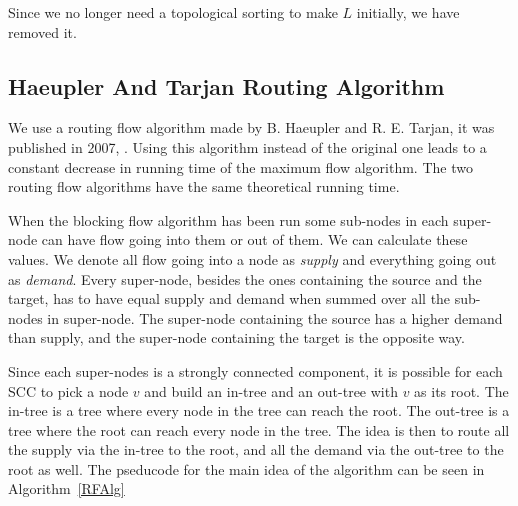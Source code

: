 Since we no longer need a topological sorting to make $L$ initially, we have removed it.

\subsection{Haeupler And Tarjan Routing Algorithm}\label{GR-RF}
We use a routing flow algorithm made by B. Haeupler and R. E. Tarjan, it was published in 2007, \cite{Haeupler2007}.
Using this algorithm instead of the original one leads to a constant decrease in running time of the maximum flow algorithm.
The two routing flow algorithms have the same theoretical running time.

When the blocking flow algorithm has been run some sub-nodes in each super-node can have flow going into them or out of them.
We can calculate these values. We denote all flow going into a node as \emph{supply} and everything going out as \emph{demand}.
Every super-node, besides the ones containing the source and the target, has to have equal supply and demand when summed over
all the sub-nodes in super-node. The super-node containing the source has a higher demand than supply, and the super-node
containing the target is the opposite way.

Since each super-nodes is a strongly connected component, it is possible for each SCC to pick a node $v$ and build an in-tree and an out-tree with $v$ as its root.
The in-tree is a tree where every node in the tree can reach the root. The out-tree is a tree where the root can reach every node in the tree.
The idea is then to route all the supply via the in-tree to the root, and all the demand via the out-tree to the root as well.
The pseducode for the main idea of the algorithm can be seen in Algorithm~\ref{RFAlg}

